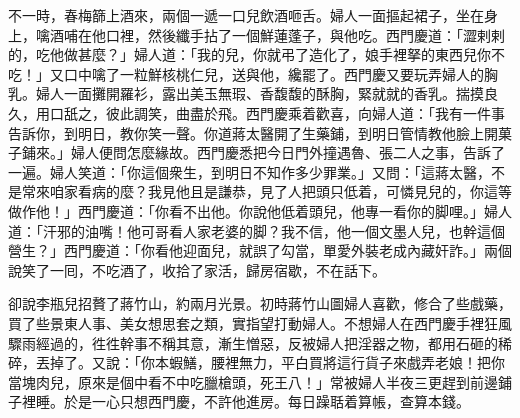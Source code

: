 不一時，春梅篩上酒來，兩個一遞一口兒飲酒咂舌。婦人一面摳起裙子，坐在身上，噙酒哺在他口裡，然後纖手拈了一個鮮蓮蓬子，{}與他吃。西門慶道：「澀剌剌的，{}吃他做甚麼？」婦人道：「我的兒，你就弔了造化了，娘手裡拏的東西兒你不吃！」又口中噙了一粒鮮核桃仁兒，{}送與他，纔罷了。西門慶又要玩弄婦人的胸乳。婦人一面攤開羅衫，露出美玉無瑕、香馥馥的酥胸，緊就就的香乳。揣摸良久，用口舐之，彼此調笑，曲盡於飛。西門慶乘着歡喜，向婦人道：「我有一件事告訴你，到明日，教你笑一聲。你道蔣太醫開了生藥鋪，到明日管情教他臉上開菓子鋪來。」婦人便問怎麼緣故。西門慶悉把今日門外撞遇魯、張二人之事，告訴了一遍。婦人笑道：「你這個衆生，到明日不知作多少罪業。」又問：「這蔣太醫，不是常來咱家看病的麼？我見他且是謙恭，見了人把頭只低着，可憐見兒的，你這等做作他！」西門慶道：「你看不出他。你說他低着頭兒，他專一看你的脚哩。」婦人道：「汗邪的油嘴！他可哥看人家老婆的脚？我不信，他一個文墨人兒，{}也幹這個營生？」{}西門慶道：「你看他迎面兒，就誤了勾當，單愛外裝老成內藏奸詐。」兩個說笑了一囘，不吃酒了，收拾了家活，歸房宿歇，不在話下。

卻說李瓶兒招贅了蔣竹山，約兩月光景。初時蔣竹山圖婦人喜歡，修合了些戲藥，買了些景東人事、美女想思套之類，實指望打動婦人。不想婦人在西門慶手裡狂風驟雨經過的，徃徃幹事不稱其意，漸生憎惡，反被婦人把淫器之物，都用石砸的稀碎，丟掉了。{}又說：「你本蝦鱔，腰裡無力，{}平白買將這行貨子來戲弄老娘！把你當塊肉兒，原來是個中看不中吃臘槍頭，死王八！」常被婦人半夜三更趕到前邊鋪子裡睡。於是一心只想西門慶，不許他進房。每日躁聒着算帳，查算本錢。

